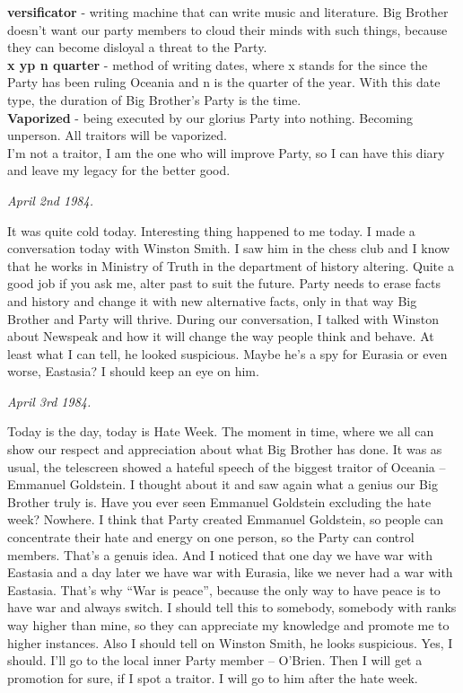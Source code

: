 \documentclass[12pt,a4paper]{article}
\begin{document}
\textbf{versificator} - writing machine that can write music and literature. Big Brother doesn't want our party members to cloud their minds with such things, because they can become disloyal a threat to the Party.\\

\textbf{x yp n quarter} - method of writing dates, where x stands for the since the Party has been ruling Oceania and n is the quarter of the year. With this date type, the duration of Big Brother's Party is the time.\\

\textbf{Vaporized} - being executed by our glorius Party into nothing. Becoming unperson. All traitors will be vaporized.\\

I'm not a traitor, I am the one who will improve Party, so I can have this diary and leave my legacy for the better good.\\

\begin{flushleft}
  \textit{April 2nd 1984.}
  \end{flushleft}

It was quite cold today. Interesting thing happened to me today. I made a conversation today with Winston Smith. I saw him in the chess club and I know that he works in Ministry of Truth in the department of history altering. Quite a good job if you ask me, alter past to suit the future. Party needs to erase facts and history and change it with new alternative facts, only in that way Big Brother and Party will thrive. During our conversation, I talked with Winston about Newspeak and how it will change the way people think and behave. At least what I can tell, he looked suspicious. Maybe he's a spy for Eurasia or even worse, Eastasia? I should keep an eye on him.\\

\begin{flushleft}
  \textit{April 3rd 1984.}
  \end{flushleft}

Today is the day, today is Hate Week. The moment in time, where we all can show our respect and appreciation about what Big Brother has done. It was as usual, the telescreen showed a hateful speech of the biggest traitor of Oceania – Emmanuel Goldstein. I thought about it and saw again what a genius our Big Brother truly is. Have you ever seen Emmanuel Goldstein excluding the hate week? Nowhere. I think that Party created Emmanuel Goldstein, so people can concentrate their hate and energy on one person, so the Party can control members. That's a genuis idea. And I noticed that one day we have war with Eastasia and a day later we have war with Eurasia, like we never had a war with Eastasia. That's why “War is peace”, because the only way to have peace is to have war and always switch. I should tell this to somebody, somebody with ranks way higher than mine, so they can appreciate my knowledge and promote me to higher instances. Also I should tell on Winston Smith, he looks suspicious. Yes, I should. I'll go to the local inner Party member – O'Brien.  Then I will get a promotion for sure, if I spot a traitor. I will go to him after the hate week.\\
\end{document}
